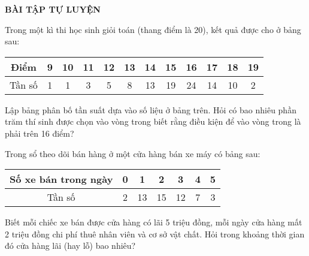 \begin{center}
\textbf{BÀI TẬP TỰ LUYỆN}
\end{center}
\begin{bt}%
Trong một kì thi học sinh giỏi toán (thang điểm là 20), kết quả được cho ở bảng sau:
\begin{center}
\begin{tabular}{ |c|c|c|c|c|c|c|c|c|c|c|c| }
\hline
Điểm & 9 & 10 & 11 & 12 & 13 & 14 & 15 & 16 & 17 & 18 & 19\\ 
\hline
Tần số & 1 & 1 & 3 & 5 & 8 & 13 & 19 & 24 & 14 & 10 &2   \\  
\hline   
\end{tabular}
\end{center}
Lập bảng phân bố tần suất dựa vào số liệu ở bảng trên. Hỏi có bao nhiêu phần trăm thí sinh được chọn vào vòng trong biết rằng điều kiện để vào vòng trong là phải trên 16 điểm?

\end{bt}

\begin{bt}%
Trong sổ theo dõi bán hàng ở một cửa hàng bán xe máy có bảng sau: 
\begin{center}
\begin{tabular}{ |c|c|c|c|c|c|c| }
\hline
Số xe bán trong ngày & 0 & 1 & 2 & 3 & 4 & 5\\ 
\hline
Tần số & 2 & 13 & 15 & 12 & 7 & 3   \\  
\hline   
\end{tabular}
\end{center}
Biết mỗi chiếc xe bán được cửa hàng có lãi 5 triệu đồng, mỗi ngày cửa hàng mất 2 triệu đồng chi phí thuê nhân viên và cơ sở vật chất. Hỏi trong khoảng thời gian đó cửa hàng lãi (hay lỗ) bao nhiêu?
\end{bt}

